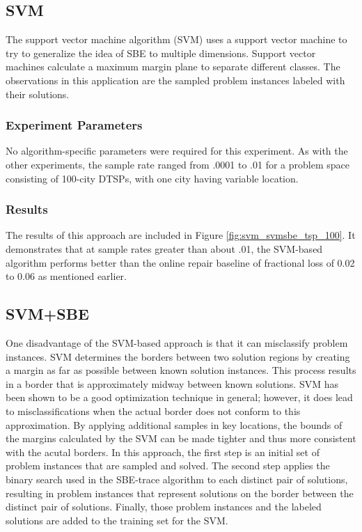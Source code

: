 \subsection{SVM} 

The support vector machine algorithm (SVM) uses a support vector machine to try to generalize the idea of SBE to multiple dimensions.  Support vector machines calculate a maximum margin plane to separate different classes.  The observations in this application are the sampled problem instances labeled with their solutions.  

\subsubsection{Experiment Parameters}

No algorithm-specific parameters were required for this experiment.  As with the other experiments, the sample rate ranged from .0001 to .01 for a problem space consisting of 100-city DTSPs, with one city having variable location.

\subsubsection{Results}  The results of this approach are included in Figure \ref{fig:svm_svmsbe_tsp_100}.  It demonstrates that at sample rates greater than about .01, the SVM-based algorithm performs better than the online repair baseline of fractional loss of 0.02 to 0.06 as mentioned earlier.

\subsection{SVM+SBE} 

One disadvantage of the SVM-based approach is that it can misclassify problem instances.  SVM determines the borders between two solution regions by creating a margin as far as possible between known solution instances.  This process results in a border that is approximately midway between known solutions.  SVM has been shown to be a good optimization technique in general; however, it does lead to misclassifications when the actual border does not conform to this approximation.  By applying additional samples in key locations, the bounds of the margins calculated by the SVM can be made tighter and thus more consistent with the acutal borders.  In this approach, the first step is an initial set of problem instances that are sampled and solved. The second step applies the binary search used in the SBE-trace algorithm to each distinct pair of solutions, resulting in problem instances that represent solutions on the border between the distinct pair of solutions.  Finally, those problem instances and the labeled solutions are added to the training set for the SVM. 

